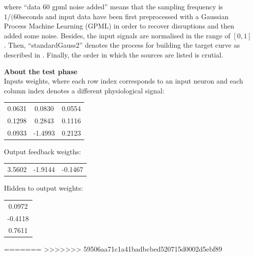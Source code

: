 \begin{description}
{where ``data 60 gpml noise  added'' means that the sampling frequency is $1/(60 \text{seconds}$ and input data have been first preprocessed with a Gaussian Process Machine Learning (GPML) in order to recover disruptions \cite{Rasmussen06gaussianprocesses} and then added some noise.
Besides, the input signals are normalised in the range of $[0,1]$. Then, ``standardGauss2'' denotes the process for building the target curve as described in . Finally, the order in which the sources are listed is crutial. 
}

\item {\textbf{About the test phase}\hfill \\
Inputs weights, where each row index corresponds to an input neuron and each column index denotes a different physiological signal:\\
\begin{center}
\begin{tabular}{ c c c }
    0.0631   & 0.0830   & 0.0554 \\
    0.1298   & 0.2843   & 0.1116 \\
    0.0933   &-1.4993   & 0.2123
\end{tabular}
\end{center}

Output feedback weigths:
\begin{center}
\begin{tabular}{ c c c }
	3.5602  & -1.9144   &-0.1467
\end{tabular}
\end{center}
}

Hidden to output weights:
\begin{center}
\begin{tabular}{ c }
0.0972\\
   -0.4118\\
    0.7611
    \end{tabular}
\end{center}

\end{description}






=======
>>>>>>> 59506aa71c1a41badbcbed520715d0002d5ebf89
